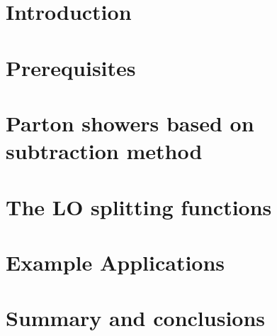 \documentclass[12pt,a4paper,oneside]{report}
\begin{document}
    \parindent=0pt
    \linespread{1.2}
    \thispagestyle{plain}


\newpage
\thispagestyle{empty}
\quad
\newpage

\newpage
\thispagestyle{empty}
\quad
\newpage


\newpage
\thispagestyle{empty}
\quad
\newpage

\tableofcontents
\thispagestyle{empty}

\newpage
\thispagestyle{empty}
\quad
\newpage

\chapter{Introduction}

\newpage
\thispagestyle{empty}
\quad
\newpage
\chapter{Prerequisites}
\label{Prerequisites}

\chapter{Parton showers based on\\ subtraction method}
\label{Parton showers}



\label{parametrisation}
\newpage

\chapter{The LO splitting functions}
\label{LO}

\newpage

\newpage
 
\newpage
  
\newpage
\chapter{Example Applications}
\label{Example Applications}

\chapter{Summary and conclusions}
\label{Summary}
  
  
\end{document}
